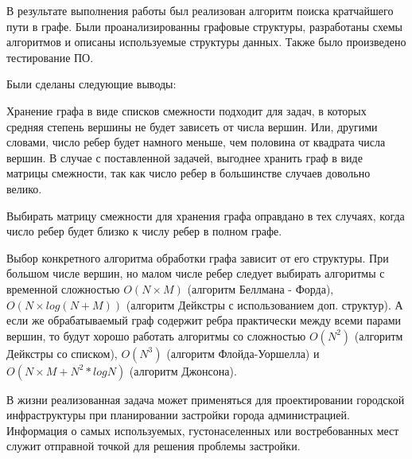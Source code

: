 \Conclusion

В результате выполнения работы был реализован алгоритм поиска кратчайшего пути в графе. Были проанализированны графовые структуры, разработаны схемы алгоритмов и описаны используемые структуры данных. Также было произведено тестирование ПО.

Были сделаны следующие выводы:

Хранение графа в виде списков смежности подходит для задач, в которых средняя степень вершины не будет зависеть от числа вершин. Или, другими словами, число ребер будет намного меньше, чем половина от квадрата числа вершин. В случае с поставленной задачей, выгоднее хранить граф в виде матрицы смежности, так как число ребер в большинстве случаев довольно велико.

Выбирать матрицу смежности для хранения графа оправдано в тех случаях, когда число ребер будет близко к числу ребер в полном графе.

Выбор конкретного алгоритма обработки графа зависит от его структуры. При большом числе вершин, но малом числе ребер следует выбирать алгоритмы с временной сложностью $O(N\times M)$ (алгоритм Беллмана - Форда), $O(N\times log(N + M))$ (алгоритм Дейкстры с использованием доп. структур). А если же обрабатываемый граф содержит ребра практически между всеми парами вершин, то будут хорошо работать алгоритмы со сложностью $O(N^2)$ (алгоритм Дейкстры со списком), $O(N^3)$ (алгоритм Флойда-Уоршелла) и $O(N\times M + N^2*logN)$ (алгоритм Джонсона).

В жизни реализованная задача может применяться для проектировании городской инфраструктуры при планировании застройки города администрацией. Информация о самых используемых, густонаселенных или востребованных мест служит отправной точкой для решения проблемы застройки.